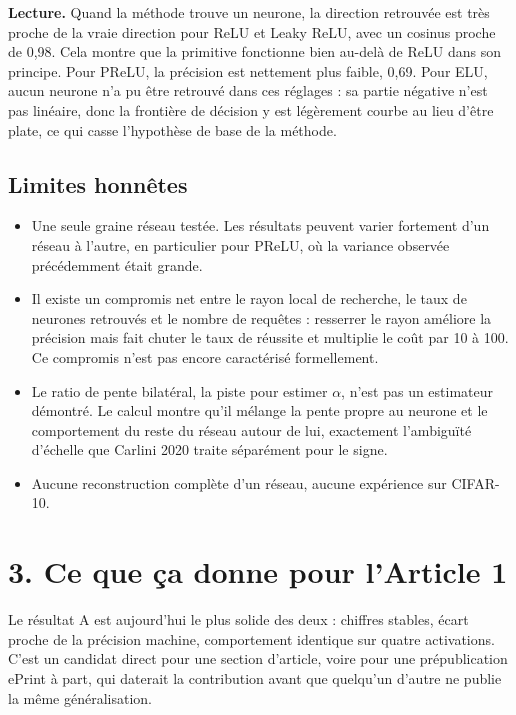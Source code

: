 \documentclass[11pt]{article}
\begin{document}
\textbf{Lecture.} Quand la méthode trouve un neurone, la direction retrouvée est très proche de la vraie direction pour ReLU et Leaky ReLU, avec un cosinus proche de 0,98. Cela montre que la primitive fonctionne bien au-delà de ReLU dans son principe. Pour PReLU, la précision est nettement plus faible, 0,69. Pour ELU, aucun neurone n'a pu être retrouvé dans ces réglages : sa partie négative n'est pas linéaire, donc la frontière de décision y est légèrement courbe au lieu d'être plate, ce qui casse l'hypothèse de base de la méthode.

\subsection*{Limites honnêtes}

\begin{itemize}
  \item Une seule graine réseau testée. Les résultats peuvent varier fortement d'un réseau à l'autre, en particulier pour PReLU, où la variance observée précédemment était grande.
  \item Il existe un compromis net entre le rayon local de recherche, le taux de neurones retrouvés et le nombre de requêtes : resserrer le rayon améliore la précision mais fait chuter le taux de réussite et multiplie le coût par 10 à 100. Ce compromis n'est pas encore caractérisé formellement.
  \item Le ratio de pente bilatéral, la piste pour estimer $\alpha$, n'est pas un estimateur démontré. Le calcul montre qu'il mélange la pente propre au neurone et le comportement du reste du réseau autour de lui, exactement l'ambiguïté d'échelle que Carlini 2020 traite séparément pour le signe.
  \item Aucune reconstruction complète d'un réseau, aucune expérience sur CIFAR-10.
\end{itemize}

\section*{3. Ce que ça donne pour l'Article 1}

Le résultat A est aujourd'hui le plus solide des deux : chiffres stables, écart proche de la précision machine, comportement identique sur quatre activations. C'est un candidat direct pour une section d'article, voire pour une prépublication ePrint à part, qui daterait la contribution avant que quelqu'un d'autre ne publie la même généralisation.
\end{document}
